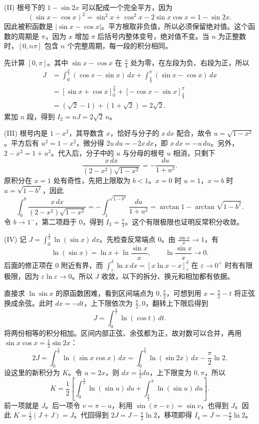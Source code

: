 \documentclass[UTF8,zihao=-4,fontset=fandol]{ctexart}
\begin{document}
(II) 根号下的 $1-\sin2x$ 可以配成一个完全平方，因为
\[
(\sin x-\cos x)^2=\sin^2x+\cos^2x-2\sin x\cos x=1-\sin2x.
\]
因此被积函数是 $|\sin x-\cos x|$。平方根取非负值，所以必须保留绝对值。这个函数的周期是 $\pi$，因为 $x$ 增加 $\pi$ 后括号内整体变号，绝对值不变。当 $n$ 为正整数时，$[0,n\pi]$ 包含 $n$ 个完整周期，每一段的积分相同。

先计算 $[0,\pi]$。其中 $\sin x-\cos x$ 在 $\frac\pi4$ 处为零，在左段为负、右段为正，所以
\[
\begin{aligned}
J&=\int_0^{\frac\pi4}(\cos x-\sin x)\,dx+
\int_{\frac\pi4}^{\pi}(\sin x-\cos x)\,dx\\
&=[\sin x+\cos x]_0^{\frac\pi4}
+[-\cos x-\sin x]_{\frac\pi4}^{\pi}\\
&=(\sqrt2-1)+(1+\sqrt2)=2\sqrt2.
\end{aligned}
\]
累加 $n$ 段，得到 $I_2=nJ=2\sqrt2\,n$。

(III) 根号内是 $1-x^2$，其导数含 $x$，恰好与分子的 $x\,dx$ 配合，故令 $u=\sqrt{1-x^2}$。平方后有 $u^2=1-x^2$，微分得 $2u\,du=-2x\,dx$，即 $x\,dx=-u\,du$。另外，$2-x^2=1+u^2$。代入后，分子中的 $u$ 与分母的根号 $u$ 相消，只剩下
\[
\frac{x\,dx}{(2-x^2)\sqrt{1-x^2}}=-\frac{du}{1+u^2}.
\]
原积分在 $x=1$ 处有奇性，先把上限取为 $b<1$。$x=0$ 时 $u=1$，$x=b$ 时 $u=\sqrt{1-b^2}$，因此
\[
\int_0^b\frac{x\,dx}{(2-x^2)\sqrt{1-x^2}}
=-\int_1^{\sqrt{1-b^2}}\frac{du}{1+u^2}
=\arctan1-\arctan\sqrt{1-b^2}.
\]
令 $b\to1^-$，第二项趋于 $0$，得到 $I_3=\frac\pi4$。这个有限极限也证明反常积分收敛。

(IV) 记 $J=\int_0^{\frac\pi2}\ln(\sin x)\,dx$。先检查反常端点 $0$。由 $\frac{\sin x}{x}\to1$，有
\[
\ln(\sin x)=\ln x+\ln\frac{\sin x}{x},\qquad
\ln\frac{\sin x}{x}\longrightarrow0.
\]
后面的修正项在 $0$ 附近有界，而 $\int_\varepsilon^\delta\ln x\,dx=[x\ln x-x]_\varepsilon^\delta$ 在 $\varepsilon\to0^+$ 时有有限极限，因为 $\varepsilon\ln\varepsilon\to0$。所以 $J$ 收敛，以下的拆分、换元和相加都有依据。

直接求 $\ln\sin x$ 的原函数困难，看到区间端点为 $0,\frac\pi2$，可想到用 $x=\frac\pi2-t$ 将正弦换成余弦。此时 $dx=-dt$，上下限依次为 $\frac\pi2,0$，翻转上下限后得到
\[
J=\int_0^{\frac\pi2}\ln(\cos t)\,dt.
\]
将两份相等的积分相加。区间内部正弦、余弦都为正，故对数可以合并，再用 $\sin x\cos x=\frac12\sin2x$：
\[
2J=\int_0^{\frac\pi2}\ln(\sin x\cos x)\,dx
=\int_0^{\frac\pi2}\ln(\sin2x)\,dx-\frac\pi2\ln2.
\]
设这里的新积分为 $K$。令 $u=2x$，则 $dx=\frac12du$，上下限变为 $0,\pi$，所以
\[
K=\frac12\left[\int_0^{\frac\pi2}\ln(\sin u)\,du+
\int_{\frac\pi2}^{\pi}\ln(\sin u)\,du\right].
\]
前一项就是 $J$。后一项令 $v=\pi-u$，利用 $\sin(\pi-v)=\sin v$，也得到 $J$。因此 $K=\frac12(J+J)=J$。代回得到 $2J=J-\frac\pi2\ln2$，移项即得 $I_4=J=-\frac\pi2\ln2$。
\end{document}
